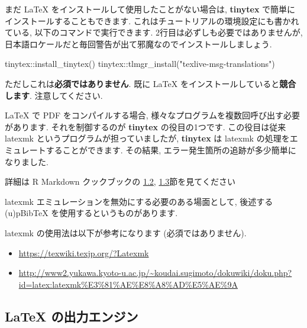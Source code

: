 \documentclass[
]{ltjsarticle}
\newenvironment{Shaded}{\begin{snugshade}}{\end{snugshade}}
\newcommand{\FunctionTok}[1]{\textcolor[rgb]{0.00,0.00,0.00}{#1}}
\newcommand{\NormalTok}[1]{#1}
\newcommand{\SpecialCharTok}[1]{\textcolor[rgb]{0.00,0.00,0.00}{#1}}
\newcommand{\StringTok}[1]{\textcolor[rgb]{0.31,0.60,0.02}{#1}}
\providecommand{\tightlist}{%
  \setlength{\itemsep}{0pt}\setlength{\parskip}{0pt}}
\begin{document}
まだ LaTeX をインストールして使用したことがない場合は, \textbf{tinytex} で簡単にインストールすることもできます. これはチュートリアルの環境設定にも書かれている, 以下のコマンドで実行できます. 2行目は必ずしも必要ではありませんが, 日本語ロケールだと毎回警告が出て邪魔なのでインストールしましょう.

\begin{Shaded}
\begin{Highlighting}[numbers=left,,]
\NormalTok{tinytex}\SpecialCharTok{::}\FunctionTok{install\_tinytex}\NormalTok{()}
\NormalTok{tinytex}\SpecialCharTok{::}\FunctionTok{tlmgr\_install}\NormalTok{(}\StringTok{"texlive{-}msg{-}translations"}\NormalTok{)}
\end{Highlighting}
\end{Shaded}

ただしこれは\textbf{必須ではありません}. 既に LaTeX をインストールしていると\textbf{競合します}. 注意してください.

LaTeX で PDF をコンパイルする場合, 様々なプログラムを複数回呼び出す必要があります. それを制御するのが \textbf{tinytex} の役目の1つです. この役目は従来 latexmk というプログラムが担っていましたが, \textbf{tinytex} は latexmk の処理をエミュレートすることができます. その結果, エラー発生箇所の追跡が多少簡単になりました.

詳細は R Markdown クックブックの \href{https://gedevan-aleksizde.github.io/rmarkdown-cookbook/install-latex.html}{1.2}, \href{https://gedevan-aleksizde.github.io/rmarkdown-cookbook/install-latex-pkgs.html}{1.3}節を見てください

latexmk エミュレーションを無効にする必要のある場面として, 後述する (u)pBibTeX を使用するというものがあります.

latexmk の使用法は以下が参考になります (必須ではありません).

\begin{itemize}
\tightlist
\item
  \url{https://texwiki.texjp.org/?Latexmk}
\item
  \url{http://www2.yukawa.kyoto-u.ac.jp/~koudai.sugimoto/dokuwiki/doku.php?id=latex:latexmk\%E3\%81\%AE\%E8\%A8\%AD\%E5\%AE\%9A}
\end{itemize}

\hypertarget{latex-ux306eux51faux529bux30a8ux30f3ux30b8ux30f3}{%
\subsection{LaTeX の出力エンジン}\label{latex-ux306eux51faux529bux30a8ux30f3ux30b8ux30f3}}
\end{document}

